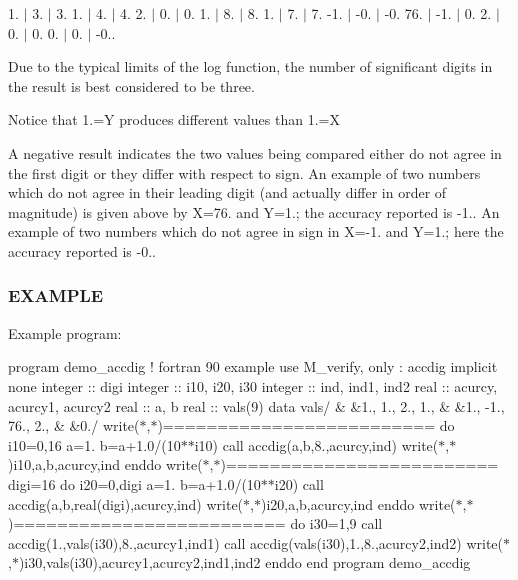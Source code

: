 1. $\vert$ 3. $\vert$ 3. 1. $\vert$ 4. $\vert$ 4. 2. $\vert$ 0. $\vert$ 0. 1. $\vert$ 8. $\vert$ 8. 1. $\vert$ 7. $\vert$ 7. -\/1. $\vert$ -\/0. $\vert$ -\/0. 76. $\vert$ -\/1. $\vert$ 0. 2. $\vert$ 0. $\vert$ 0. 0. $\vert$ 0. $\vert$ -\/0..

Due to the typical limits of the log function, the number of significant digits in the result is best considered to be three.

Notice that 1.=Y produces different values than 1.=X

A negative result indicates the two values being compared either do not agree in the first digit or they differ with respect to sign. An example of two numbers which do not agree in their leading digit (and actually differ in order of magnitude) is given above by X=76. and Y=1.; the accuracy reported is -\/1.. An example of two numbers which do not agree in sign in X=-\/1. and Y=1.; here the accuracy reported is -\/0..

\subsubsection*{E\+X\+A\+M\+P\+LE}

Example program\+:

program demo\+\_\+accdig ! fortran 90 example use M\+\_\+verify, only \+: accdig implicit none integer \+:\+: digi integer \+:\+: i10, i20, i30 integer \+:\+: ind, ind1, ind2 real \+:\+: acurcy, acurcy1, acurcy2 real \+:\+: a, b real \+:\+: vals(9) data vals/ \& \&1., 1., 2., 1., \& \&1., -\/1., 76., 2., \& \&0./ write($\ast$,$\ast$)\textquotesingle{}=========================\textquotesingle{} do i10=0,16 a=1. b=a+1.0/(10$\ast$$\ast$i10) call accdig(a,b,8.,acurcy,ind) write($\ast$,$\ast$)i10,a,b,acurcy,ind enddo write($\ast$,$\ast$)\textquotesingle{}=========================\textquotesingle{} digi=16 do i20=0,digi a=1. b=a+1.0/(10$\ast$$\ast$i20) call accdig(a,b,real(digi),acurcy,ind) write($\ast$,$\ast$)i20,a,b,acurcy,ind enddo write($\ast$,$\ast$)\textquotesingle{}=========================\textquotesingle{} do i30=1,9 call accdig(1.,vals(i30),8.,acurcy1,ind1) call accdig(vals(i30),1.,8.,acurcy2,ind2) write($\ast$,$\ast$)i30,vals(i30),acurcy1,acurcy2,ind1,ind2 enddo end program demo\+\_\+accdig


